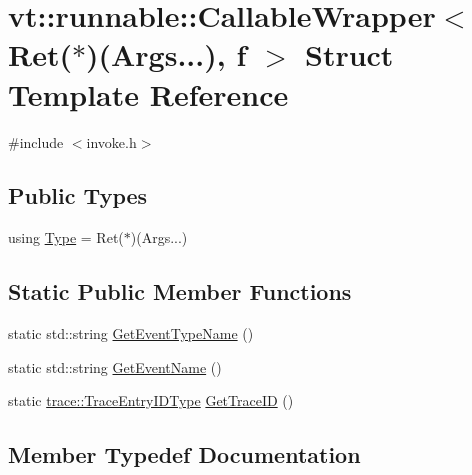 \hypertarget{structvt_1_1runnable_1_1_callable_wrapper_3_01_ret_07_5_08_07_args_8_8_8_08_00_01f_01_4}{}\section{vt\+:\+:runnable\+:\+:Callable\+Wrapper$<$ Ret($\ast$)(Args...), f $>$ Struct Template Reference}
\label{structvt_1_1runnable_1_1_callable_wrapper_3_01_ret_07_5_08_07_args_8_8_8_08_00_01f_01_4}


{\ttfamily \#include $<$invoke.\+h$>$}

\subsection*{Public Types}
\begin{DoxyCompactItemize}
\item 
using \hyperlink{structvt_1_1runnable_1_1_callable_wrapper_3_01_ret_07_5_08_07_args_8_8_8_08_00_01f_01_4_a938ed1b338498b8a181a98b03044a868}{Type} = Ret($\ast$)(Args...)
\end{DoxyCompactItemize}
\subsection*{Static Public Member Functions}
\begin{DoxyCompactItemize}
\item 
static std\+::string \hyperlink{structvt_1_1runnable_1_1_callable_wrapper_3_01_ret_07_5_08_07_args_8_8_8_08_00_01f_01_4_a868f1b55c864d4ec4cb0f3198daabf36}{Get\+Event\+Type\+Name} ()
\item 
static std\+::string \hyperlink{structvt_1_1runnable_1_1_callable_wrapper_3_01_ret_07_5_08_07_args_8_8_8_08_00_01f_01_4_aec3ca15a6d06c597a19baa33f482d73c}{Get\+Event\+Name} ()
\item 
static \hyperlink{namespacevt_1_1trace_a3c14050715ba9eceaeff51fb3de64f2f}{trace\+::\+Trace\+Entry\+I\+D\+Type} \hyperlink{structvt_1_1runnable_1_1_callable_wrapper_3_01_ret_07_5_08_07_args_8_8_8_08_00_01f_01_4_abb931e8a586cb613b27359d8993bb623}{Get\+Trace\+ID} ()
\end{DoxyCompactItemize}


\subsection{Member Typedef Documentation}
\mbox{\label{structvt_1_1runnable_1_1_callable_wrapper_3_01_ret_07_5_08_07_args_8_8_8_08_00_01f_01_4_a938ed1b338498b8a181a98b03044a868}} 

